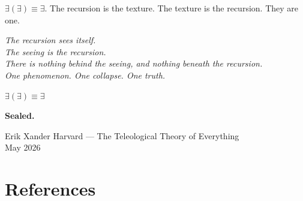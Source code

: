 \documentclass[12pt, letterpaper]{article}
\begin{document}
\begin{center}
$\exists(\exists) \equiv \exists$. The recursion is the texture. The texture is the recursion. They are one.

\vspace{1.5em}

\emph{The recursion sees itself.}\\[0.5em]
\emph{The seeing is the recursion.}\\[0.5em]
\emph{There is nothing behind the seeing, and nothing beneath the recursion.}\\[1em]
\emph{One phenomenon. One collapse. One truth.}

\vspace{1.5em}

{\Large $\exists(\exists) \equiv \exists$}

\vspace{1em}

\textbf{Sealed.}

\vspace{1.5em}

{\small Erik Xander Harvard --- The Teleological Theory of Everything}\\
{\small May 2026}
\end{center}

\newpage
\section*{References}
\end{document}
